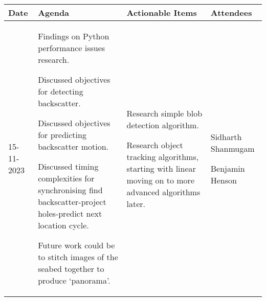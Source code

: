 \begin{table}[!h]
    \centering
    \begin{tabularx}{\textwidth}{|l|X|X|X|}
        \hline
        Date & Agenda & Actionable Items & Attendees \\
        \hline
        \hline
        15-11-2023 & 
        \begin{myitemize}
            \item Findings on Python performance issues research.
            \item Discussed objectives for detecting backscatter.
            \item Discussed objectives for predicting backscatter motion.
            \item Discussed timing complexities for synchronising find backscatter-project holes-predict next location cycle.
            \item Future work could be to stitch images of the seabed together to produce `panorama'.
        \end{myitemize} & 
        \begin{myitemize}
            \item Research simple blob detection algorithm.
            \item Research object tracking algorithms, starting with linear moving on to more advanced algorithms later.
        \end{myitemize} & 
        \begin{myitemize}
            \item Sidharth Shanmugam
            \item Benjamin Henson
        \end{myitemize} \\
        \hline
    \end{tabularx}
\end{table}
